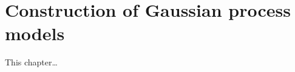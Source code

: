 
\inbpdocument

\chapter{Construction of Gaussian process models}
\label{ch:construction}

This chapter\dots

\outbpdocument{


}
